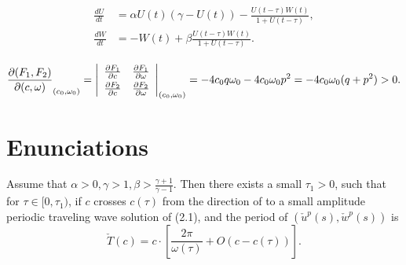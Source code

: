 \documentclass{comnet}%
\begin{document}
\begin{align}\label{1.2}
\begin{split}
\frac{dU}{dt} &=\alpha U(t)(\gamma -U(t))-\frac{U(t-\tau)W(t)}{1+U(t-\tau)},\\
\frac{dW}{dt} &=-W(t)+\beta\frac{U(t-\tau)W(t)}{1+U(t-\tau)}.
\end{split}
\end{align}

\[
\frac{\partial(F_1,F_2)}{\partial(c,\omega)}_{(c_0,\omega_0)} = \left|
\begin{array}{ll}
\frac{\partial F_1}{\partial c} &\frac{\partial F_1}{\partial \omega} \\\noalign{\vskip3pt}
\frac{\partial F_2}{\partial c}&\frac{\partial F_2}{\partial \omega}
\end{array}\right|_{(c_0,\omega_0)}=-4c_0q\omega_0 -4c_0\omega_0p^2 =-4c_0\omega_0(q+p^2)>0.
\]

\section{Enunciations}





\begin{theorem}\label{T0.1}
Assume that $\alpha>0, \gamma>1, \beta>\frac{\gamma+1}{\gamma-1}$.
Then there exists a small $\tau_1>0$, such that for $\tau\in
[0,\tau_1)$, if $c$ crosses $c(\tau)$ from the direction of
to  a small amplitude periodic traveling wave solution of
(2.1), and the period of $(\check{u}^p(s),\check{w}^p(s))$ is
\[
\check{T}(c)=c\cdot \left[\frac{2\pi}{\omega(\tau)}+O(c-c(\tau))\right].
\]
\end{theorem}
\end{document}
